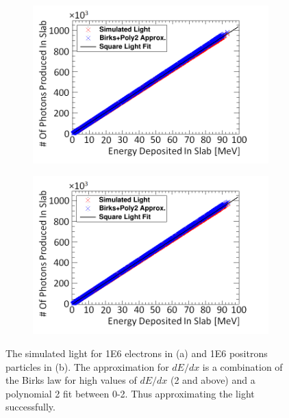 \begin{figure}[htbp]
\centering
\begin{subfigure}{.5\textwidth}
  \centering
  \includegraphics[width=\linewidth]{Chapter4/Figs/Raster/electronSimulatedLightBirksAndPoly2New.png}
  \captionsetup{width=.9\linewidth}
  \caption{}
  \label{subfig:append5_light_of_electronsLin0-100mev}
\end{subfigure}%
\begin{subfigure}{.5\textwidth}
  \centering
  \includegraphics[width=\linewidth]{Chapter4/Figs/Raster/positronSimulatedLightBirksAndPoly2New.png}
  \captionsetup{width=.9\linewidth}
  \caption{}
  \label{subfig:append5_light_of_positronsLin0-100mev}
\end{subfigure}
\caption[Birks' light approximation + 2$^\textrm{nd}$ order polynomial for electrons and positrons compared to simulation.]{The simulated light for 1E6 electrons in (a) and 1E6 positrons particles in (b). The approximation for $dE/dx$ is a combination of the Birks law for high values of $dE/dx$ (2 and above) and a polynomial 2 fit between 0-2. Thus approximating the light successfully.}
\label{fig:append5_light_of_electrons_positronsLin0-100mev}
\end{figure}